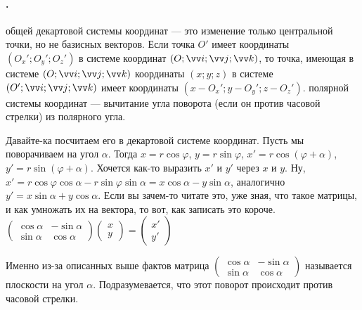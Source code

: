 \documentclass{article}
\let\vec\vv
\begin{document}
    \paragraph{.}
    \begin{itemize}
        \dfn {} общей декартовой системы координат --- это изменение только центральной точки, но не базисных векторов.
        \thm Если точка $O'$ имеет координаты $(O_x';O_y';O_z')$ в системе координат $(O;\vec i;\vec j;\vec k)$, то точка, имеющая в системе $(O;\vec i;\vec j;\vec k)$ координаты $(x;y;z)$ в системе $(O';\vec i;\vec j;\vec k)$ имеет координаты $(x-O_x';y-O_y';z-O_z')$.
        \dfn {} полярной системы координат --- вычитание угла поворота (если он против часовой стрелки) из полярного угла.
        \begin{Comment}
            Давайте-ка посчитаем его в декартовой системе координат. Пусть мы поворачиваем на угол $\alpha$. Тогда $x=r\cos\varphi$, $y=r\sin\varphi$, $x'=r\cos(\varphi+\alpha)$, $y'=r\sin(\varphi+\alpha)$. Хочется как-то выразить $x'$ и $y'$ через $x$ и $y$. Ну, $x'=r\cos\varphi\cos\alpha-r\sin\varphi\sin\alpha=x\cos\alpha-y\sin\alpha$, аналогично $y'=x\sin\alpha+y\cos\alpha$. Если вы зачем-то читате это, уже зная, что такое матрицы, и как умножать их на вектора, то вот, как записать это короче. $\left(\begin{matrix}
                \cos\alpha & -\sin\alpha\\
                \sin\alpha & \cos\alpha
            \end{matrix}\right)\left(\begin{matrix}
                x\\
                y
            \end{matrix}\right)=\left(\begin{matrix}
                x'\\
                y'
            \end{matrix}\right)$
        \end{Comment}
        \dfn Именно из-за описанных выше фактов матрица $\left(\begin{matrix}
            \cos\alpha & -\sin\alpha\\
            \sin\alpha & \cos\alpha
        \end{matrix}\right)$ называется  плоскости на угол $\alpha$. Подразумевается, что этот поворот происходит против часовой стрелки.

\end{itemize}
\end{document}
